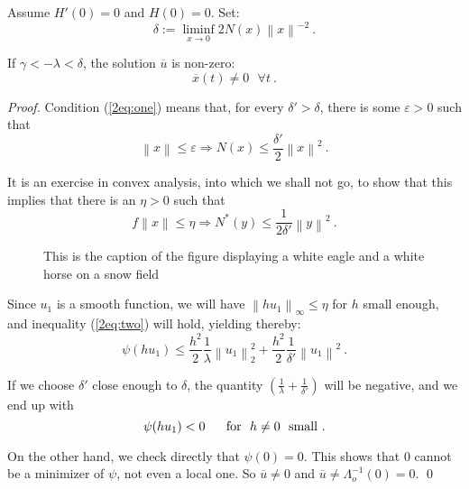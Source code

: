 \documentclass{llncs}
\begin{document}
    \begin{proposition}
    Assume $H'(0)=0$ and $ H(0)=0$. Set:
    \begin{equation}
      \delta := \liminf_{x\to 0} 2 N (x) \left\|x\right\|^{-2}\ .
      \label{2eq:one}
    \end{equation}
    
    If $\gamma < - \lambda < \delta$,
    the solution $\overline{u}$ is non-zero:
    \begin{equation}
      \overline{x} (t) \ne 0\ \ \ \forall t\ .
    \end{equation}
    \end{proposition}
    \begin{proof}
    Condition (\ref{2eq:one}) means that, for every
    $\delta ' > \delta$, there is some $\varepsilon > 0$ such that
    \begin{equation}
      \left\|x\right\| \le \varepsilon \Rightarrow N (x) \le
      \frac{\delta '}{2} \left\|x\right\|^{2}\ .
    \end{equation}
    
    It is an exercise in convex analysis, into which we shall not go, to
    show that this implies that there is an $\eta > 0$ such that
    \begin{equation}
      f\left\|x\right\| \le \eta
      \Rightarrow N^{\ast} (y) \le \frac{1}{2\delta '}
      \left\|y\right\|^{2}\ .
      \label{2eq:two}
    \end{equation}
    
    \begin{figure}
    \vspace{2.5cm}
    \caption{This is the caption of the figure displaying a white eagle and
    a white horse on a snow field}
    \end{figure}
    
    Since $u_{1}$ is a smooth function, we will have
    $\left\|hu_{1}\right\|_\infty \le \eta$
    for $h$ small enough, and inequality (\ref{2eq:two}) will hold,
    yielding thereby:
    \begin{equation}
      \psi (hu_{1}) \le \frac{h^{2}}{2}
      \frac{1}{\lambda} \left\|u_{1} \right\|_{2}^{2} + \frac{h^{2}}{2}
      \frac{1}{\delta '} \left\|u_{1}\right\|^{2}\ .
    \end{equation}
    
    If we choose $\delta '$ close enough to $\delta$, the quantity
    $\left(\frac{1}{\lambda} + \frac{1}{\delta '}\right)$
    will be negative, and we end up with
    \begin{equation}
      \psi (hu_{1}) < 0\ \ \ \ \ {\rm for}\ \ h\ne 0\ \ {\rm small}\ .
    \end{equation}
    
    On the other hand, we check directly that $\psi (0) = 0$. This shows
    that 0 cannot be a minimizer of $\psi$, not even a local one.
    So $\overline{u} \ne 0$ and
    $\overline{u} \ne \Lambda_{o}^{-1} (0) = 0$. \qed
    \end{proof}
\end{document}
